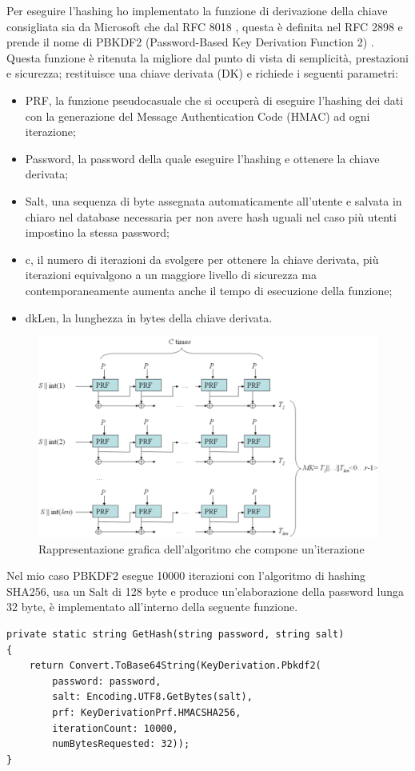 Per eseguire l'hashing ho implementato la funzione di derivazione della chiave consigliata sia da Microsoft \cite{HashingASPNET} che dal RFC 8018 \cite{RFC8018}, questa è definita nel RFC 2898 \cite{RFC2898} e prende il nome di PBKDF2 (Password-Based Key Derivation Function 2) \cite{PBKDF2}. Questa funzione è ritenuta la migliore dal punto di vista di semplicità, prestazioni e sicurezza; restituisce una chiave derivata (DK) e richiede i seguenti parametri:
\begin{itemize}
    \item PRF, la funzione pseudocasuale che si occuperà di eseguire l'hashing dei dati con la generazione del Message Authentication Code (HMAC) ad ogni iterazione;
    \item Password, la password della quale eseguire l'hashing e ottenere la chiave derivata;
    \item Salt, una sequenza di byte assegnata automaticamente all'utente e salvata in chiaro nel database necessaria per non avere hash uguali nel caso più utenti impostino la stessa password;
    \item c, il numero di iterazioni da svolgere per ottenere la chiave derivata, più iterazioni equivalgono a un maggiore livello di sicurezza ma contemporaneamente aumenta anche il tempo di esecuzione della funzione;
    \item dkLen, la lunghezza in bytes della chiave derivata.
\end{itemize}
\medskip

\begin{figure}[ht]
    \centering\includegraphics[scale=0.44]{images/Pbkdf2.png}
    \caption{Rappresentazione grafica dell'algoritmo che compone un'iterazione}
\end{figure}

\medskip
Nel mio caso PBKDF2 esegue 10000 iterazioni con l'algoritmo di hashing SHA256, usa un Salt di 128 byte e produce un'elaborazione della password lunga 32 byte, è implementato all'interno della seguente funzione. 
\medskip

\begin{lstlisting}[style=csharp]
private static string GetHash(string password, string salt)
{
    return Convert.ToBase64String(KeyDerivation.Pbkdf2(
        password: password,
        salt: Encoding.UTF8.GetBytes(salt),
        prf: KeyDerivationPrf.HMACSHA256,
        iterationCount: 10000,
        numBytesRequested: 32));
}
\end{lstlisting}